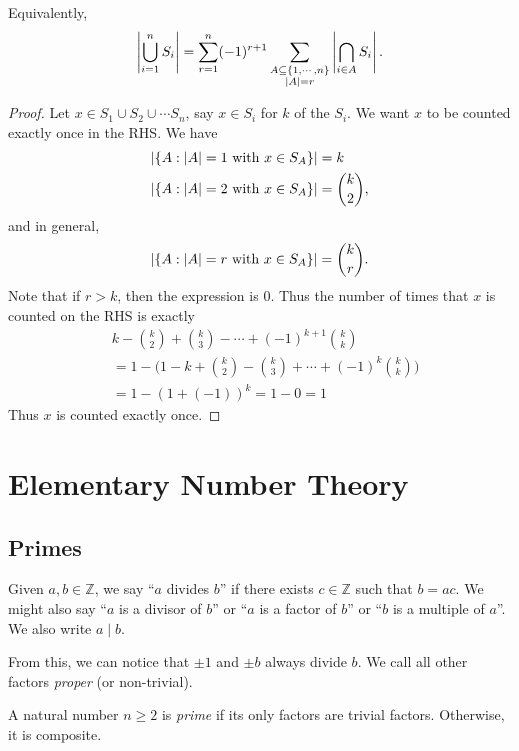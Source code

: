 \documentclass[12pt]{article}
\begin{document}
Equivalently,
\[
    \left\lvert \bigcup_{i=1}^{n} S_i \right\rvert 
    = \sum_{r=1}^{n}(-1)^{r+1} \sum_{
        \substack{A\subseteq\{1,\cdots,n\}\\\left\lvert A \right\rvert=r}
    } \left\lvert \bigcap_{i\in A} S_i \right\rvert.
\]
\begin{proof}
    Let $x \in S_{1}\cup S_{2}\cup\cdots S_n$,
    say $x \in S_i$ for $k$ of the $S_i$.
    We want $x$ to be counted exactly once in the RHS.
    We have
    \begin{align*}
        \left\lvert \{A : \left\lvert A \right\rvert=1 \text{ with } x \in S_A\} \right\rvert &= k\\
        \left\lvert \{A : \left\lvert A \right\rvert=2 \text{ with } x \in S_A\} \right\rvert &= \binom k 2,
    \end{align*}
    and in general,
    \[
        \left\lvert \{A : \left\lvert A \right\rvert=r \text{ with } x \in S_A\} \right\rvert = \binom k r.
    \]
    Note that if $r > k$, then the expression is $0$.
    Thus the number of times that $x$ is counted
    on the RHS is exactly
    \begin{align*}
        &k - \binom k 2 + \binom k 3 - \cdots + (-1)^{k+1} \binom k k\\
        &= 1 - \biggl(
            1 - k + \binom k 2 - \binom k 3 + \cdots + (-1)^{k} \binom k k
        \biggr)\\
        &= 1 - (1 + (-1))^{k} = 1 - 0 = 1
    \end{align*}
    Thus $x$ is counted exactly once.
\end{proof}

\section{Elementary Number Theory}

\subsection{Primes}

Given $a,b \in \mathbb{Z}$, we say ``$a$ divides $b$'' if
there exists $c \in \mathbb{Z}$ such that $b = ac$.
We might also say ``$a$ is a divisor of $b$''
or ``$a$ is a factor of $b$'' or ``$b$ is a multiple of $a$''.
We also write $a \mid b$.

From this, we can notice that $\pm 1$ and $\pm b$
always divide $b$. We call all other
factors \emph{proper} (or non-trivial).

\begin{definition}
    A natural number $n \ge 2$
    is \emph{prime} if its only factors
    are trivial factors.
    Otherwise, it is composite.
\end{definition}
\end{document}
